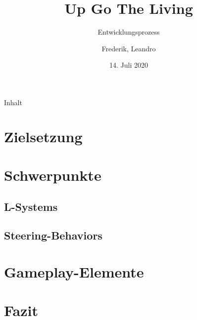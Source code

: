 \documentclass{beamer}
\title{Up Go The Living}
\subtitle{Entwicklungsprozess}
\author{Frederik, Leandro}
\institute{TU Dortmund}
\date{14. Juli 2020}
\begin{document}
\begin{frame}
\titlepage
\end{frame}

\begin{frame}{Inhalt}
\tableofcontents
\end{frame}

\section{Zielsetzung}


\section{Schwerpunkte}

\subsection{L-Systems}


\subsection{Steering-Behaviors}


\section{Gameplay-Elemente}


\section{Fazit}

\end{document}
